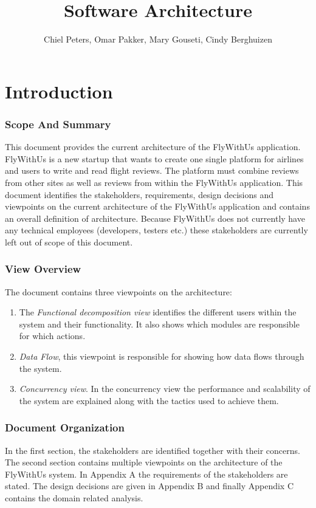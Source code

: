 \documentclass{article}
\begin{document}
\title{Software Architecture}
\author{Chiel Peters, Omar Pakker, Mary Gouseti, Cindy Berghuizen}
\maketitle
\setlength\parindent{0pt}

\section{Introduction}
\subsubsection{Scope And Summary}
This document provides the current architecture of the FlyWithUs application. FlyWithUs is a new startup that wants to create one single platform for airlines and users to write and read flight reviews. The platform must combine reviews from other sites as well as reviews from within the FlyWithUs application.
This document identifies the stakeholders, requirements, design decisions and viewpoints on the current architecture of the FlyWithUs application and contains an overall definition of architecture. Because FlyWithUs does not currently have any technical employees (developers, testers etc.) these stakeholders are currently left out of scope of this document.   
 
\subsubsection{View Overview}
The document contains three viewpoints on the architecture:
\begin{enumerate}
\item The \emph{Functional decomposition view} identifies the different users within the system and their functionality. It also shows which modules are responsible for which actions.
\item \emph{Data Flow}, this viewpoint is responsible for showing how data flows through the system.
\item \emph{Concurrency view}. In the concurrency view the performance and scalability of the system are explained along with the tactics used to achieve them.
\end{enumerate}
 
\subsubsection{Document Organization}
In the first section,  the stakeholders are identified together with their concerns.
The second section contains multiple viewpoints on the architecture of the FlyWithUs system. In Appendix A the requirements of the stakeholders are stated. The design decisions are given in Appendix B and finally Appendix C contains the domain related analysis.
\end{document}
